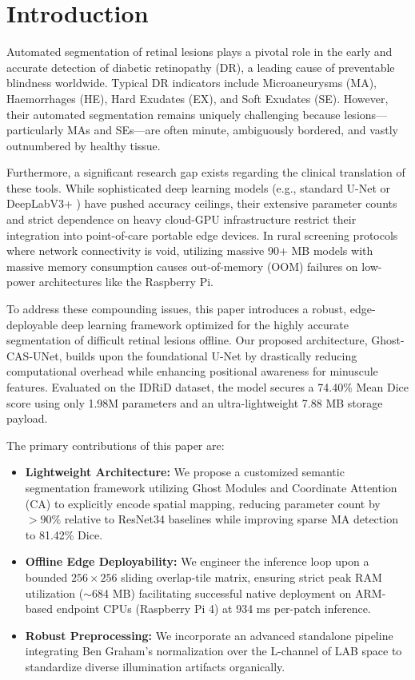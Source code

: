 \section{Introduction}
Automated segmentation of retinal lesions plays a pivotal role in the early and accurate detection of diabetic retinopathy (DR), a leading cause of preventable blindness worldwide. Typical DR indicators include Microaneurysms (MA), Haemorrhages (HE), Hard Exudates (EX), and Soft Exudates (SE). However, their automated segmentation remains uniquely challenging because lesions—particularly MAs and SEs—are often minute, ambiguously bordered, and vastly outnumbered by healthy tissue. 

Furthermore, a significant research gap exists regarding the clinical translation of these tools. While sophisticated deep learning models (e.g., standard U-Net \cite{unet_2015} or DeepLabV3+ \cite{deeplabv3_2018}) have pushed accuracy ceilings, their extensive parameter counts and strict dependence on heavy cloud-GPU infrastructure restrict their integration into point-of-care portable edge devices. In rural screening protocols where network connectivity is void, utilizing massive 90+ MB models with massive memory consumption causes out-of-memory (OOM) failures on low-power architectures like the Raspberry Pi.

To address these compounding issues, this paper introduces a robust, edge-deployable deep learning framework optimized for the highly accurate segmentation of difficult retinal lesions offline. Our proposed architecture, Ghost-CAS-UNet, builds upon the foundational U-Net by drastically reducing computational overhead while enhancing positional awareness for minuscule features. Evaluated on the IDRiD dataset, the model secures a 74.40\% Mean Dice score using only 1.98M parameters and an ultra-lightweight 7.88 MB storage payload.

The primary contributions of this paper are:
\begin{itemize}
    \item \textbf{Lightweight Architecture:} We propose a customized semantic segmentation framework utilizing Ghost Modules \cite{ghostnet_2020} and Coordinate Attention (CA) \cite{coord_attn_2021} to explicitly encode spatial mapping, reducing parameter count by $>90\%$ relative to ResNet34 baselines while improving sparse MA detection to 81.42\% Dice.
    \item \textbf{Offline Edge Deployability:} We engineer the inference loop upon a bounded $256 \times 256$ sliding overlap-tile matrix, ensuring strict peak RAM utilization ($\sim$684 MB) facilitating successful native deployment on ARM-based endpoint CPUs (Raspberry Pi 4) at 934 ms per-patch inference.
    \item \textbf{Robust Preprocessing:} We incorporate an advanced standalone pipeline integrating Ben Graham's normalization \cite{ben_graham_2015} over the L-channel of LAB space \cite{canet_2020} to standardize diverse illumination artifacts organically.
\end{itemize}

